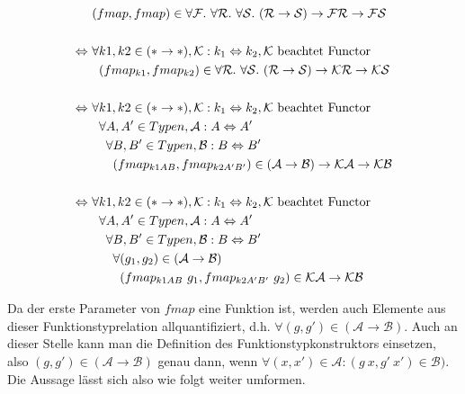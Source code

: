 \begin{align*}
&(fmap, fmap) \in \forall \mathcal{F} .~ \forall \mathcal{R} .~ \forall \mathcal{S} .~ (\mathcal{R} \rightarrow \mathcal{S})
\rightarrow \mathcal{F} \mathcal{R} \rightarrow \mathcal{F} \mathcal{S} \\
&\\
\Leftrightarrow ~&
\forall k1, k2 \in (* \rightarrow *), \mathcal{K} : k_1 \Leftrightarrow k_2, \mathcal{K}~\text{beachtet Functor} \\
& \hphantom{\forall} (fmap_{k1}, fmap_{k2}) \in \forall \mathcal{R} .~ \forall \mathcal{S} .~ (\mathcal{R} \rightarrow \mathcal{S}) \rightarrow
\mathcal{K} \mathcal{R} \rightarrow \mathcal{K} \mathcal{S} \\
&\\
\Leftrightarrow ~&
\forall k1, k2 \in (* \rightarrow *), \mathcal{K} : k_1 \Leftrightarrow k_2, \mathcal{K}~\text{beachtet Functor} \\
& \hphantom{\forall} \forall A, A' \in Typen, \mathcal{A} : A \Leftrightarrow A' \\
& \hphantom{\forall \forall} \forall B, B' \in Typen, \mathcal{B} : B \Leftrightarrow B' \\
& \hphantom{\forall \forall \forall} (fmap_{k1 A B}, fmap_{k2 A' B'}) \in (\mathcal{A} \rightarrow \mathcal{B}) \rightarrow
\mathcal{K} \mathcal{A} \rightarrow \mathcal{K} \mathcal{B} \\
&\\
\Leftrightarrow ~&
\forall k1, k2 \in (* \rightarrow *), \mathcal{K} : k_1 \Leftrightarrow k_2, \mathcal{K}~\text{beachtet Functor} \\
& \hphantom{\forall} \forall A, A' \in Typen, \mathcal{A} : A \Leftrightarrow A' \\
& \hphantom{\forall \forall} \forall B, B' \in Typen, \mathcal{B} : B \Leftrightarrow B' \\
& \hphantom{\forall \forall \forall} \forall (g_1, g_2) \in (\mathcal{A} \rightarrow \mathcal{B}) \\
& \hphantom{\forall \forall \forall \forall} (fmap_{k1 A B}\ g_1, fmap_{k2 A' B'}\ g_2) \in \mathcal{K} \mathcal{A} \rightarrow \mathcal{K} \mathcal{B} \\
\end{align*}

Da der erste Parameter von $fmap$ eine Funktion ist, werden auch Elemente aus dieser Funktionstyprelation allquantifiziert, d.h.
$\forall (g, g') \in (\mathcal{A} \rightarrow \mathcal{B})$. Auch an dieser Stelle kann man die Definition des Funktionstypkonstruktors
einsetzen, also $(g, g') \in (\mathcal{A} \rightarrow \mathcal{B})$ genau dann, wenn $\forall (x, x') \in \mathcal{A}: (g\ x, g'\ x')
\in \mathcal{B})$. Die Aussage lässt sich also wie folgt weiter umformen.

